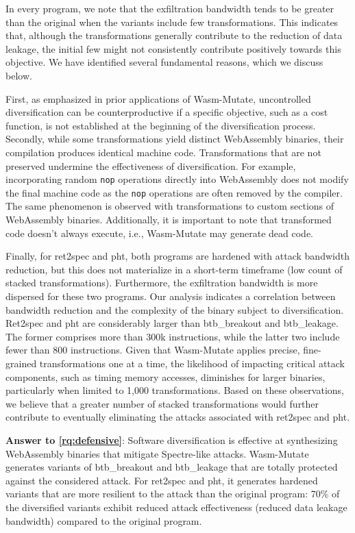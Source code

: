 \documentclass[a4paper,fleqn]{cas-dc}
\newcommand{\tool}{{\sc Wasm-Mutate}\xspace}
\newcommand{\Wasm}{WebAssembly\xspace}
\newcommand{\wasm}{\Wasm}
\begin{document}
In every program, we note that the exfiltration bandwidth tends to be greater than the original when the variants include few transformations.
This indicates that, although the transformations generally contribute to the reduction of data leakage, the initial few might not consistently contribute positively towards this objective.
We have identified several fundamental reasons, which we discuss below.

First, as emphasized in prior applications of \tool \cite{CABRERAARTEAGA2023103296}, uncontrolled diversification can be counterproductive if a specific objective, such as a cost function, is not established at the beginning of the diversification process.
Secondly, while some transformations yield distinct \wasm binaries, their compilation produces identical machine code.
Transformations that are not preserved undermine the effectiveness of diversification.
For example, incorporating random \texttt{nop} operations directly into \wasm does not modify the final machine code as the \texttt{nop} operations are often removed by the compiler.
The same phenomenon is observed with transformations to custom sections of \Wasm binaries.
Additionally, it is important to note that transformed code doesn't always execute, i.e., \tool may generate dead code.

Finally, for ret2spec and pht, both programs are hardened with attack bandwidth reduction, but this does not materialize in a short-term timeframe (low count of stacked transformations).
Furthermore,  the exfiltration bandwidth is more dispersed for these two programs.
Our analysis indicates a correlation between bandwidth reduction and the complexity of the binary subject to diversification.
Ret2spec and pht are considerably larger than btb\_breakout and btb\_leakage.
The former comprises more than 300k instructions, while the latter two include fewer than 800 instructions.
Given that \tool applies precise, fine-grained transformations one at a time, the likelihood of impacting critical attack components, such as timing memory accesses, diminishes for larger binaries, particularly when limited to 1,000 transformations.
Based on these observations, we believe that a greater number of stacked transformations would further contribute to eventually eliminating the attacks associated with ret2spec and pht.


\begin{tcolorbox}[boxrule=1pt,arc=.3em,boxsep=-1.3mm]
  \textbf{Answer to \ref{rq:defensive}}:   Software diversification is effective at synthesizing \wasm binaries that mitigate Spectre-like attacks.  
  \tool generates variants of btb\_breakout and btb\_leakage that are totally protected against the considered attack. For ret2spec and pht, it generates hardened variants that are more resilient to the attack than the original program: 70\% of the diversified variants exhibit reduced attack effectiveness (reduced data leakage bandwidth) compared to the original program.
\end{tcolorbox}
\end{document}
